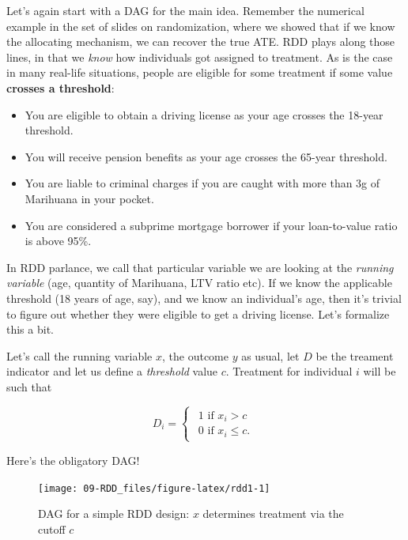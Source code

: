 \documentclass[]{book}
\providecommand{\tightlist}{%
  \setlength{\itemsep}{0pt}\setlength{\parskip}{0pt}}
\begin{document}
Let's again start with a DAG for the main idea. Remember the numerical
example in the set of slides on randomization, where we showed that if
we know the allocating mechanism, we can recover the true ATE. RDD plays
along those lines, in that we \emph{know} how individuals got assigned
to treatment. As is the case in many real-life situations, people are
eligible for some treatment if some value \textbf{crosses a threshold}:

\begin{itemize}
\tightlist
\item
  You are eligible to obtain a driving license as your age crosses the
  18-year threshold.
\item
  You will receive pension benefits as your age crosses the 65-year
  threshold.
\item
  You are liable to criminal charges if you are caught with more than 3g
  of Marihuana in your pocket.
\item
  You are considered a subprime mortgage borrower if your loan-to-value
  ratio is above 95\%.
\end{itemize}

In RDD parlance, we call that particular variable we are looking at the
\emph{running variable} (age, quantity of Marihuana, LTV ratio etc). If
we know the applicable threshold (18 years of age, say), and we know an
individual's age, then it's trivial to figure out whether they were
eligible to get a driving license. Let's formalize this a bit.

Let's call the running variable \(x\), the outcome \(y\) as usual, let
\(D\) be the treament indicator and let us define a \emph{threshold}
value \(c\). Treatment for individual \(i\) will be such that

\begin{equation*}
D_i = \begin{cases}\begin{array}{c}1\text{ if }x_i > c \\
                  0\text{ if }x_i \leq c. \end{array}
                  \end{cases}
\end{equation*}

Here's the obligatory DAG!

\begin{figure}

{\centering \texttt{[image: 09-RDD\_files/figure-latex/rdd1-1]} 

}

\caption{DAG for a simple RDD design: $x$ determines treatment via the cutoff $c$}\label{fig:rdd1}
\end{figure}
\end{document}
